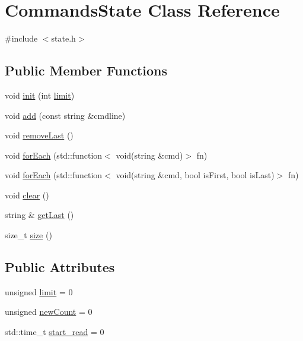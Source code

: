 \hypertarget{class_commands_state}{}\section{Commands\+State Class Reference}
\label{class_commands_state}


{\ttfamily \#include $<$state.\+h$>$}

\subsection*{Public Member Functions}
\begin{DoxyCompactItemize}
\item 
void \hyperlink{class_commands_state_a30081a551862ef539927f368fd729d1b}{init} (int \hyperlink{class_commands_state_ae3cbeca97ad210a6980d5c44cf6adee2}{limit})
\item 
void \hyperlink{class_commands_state_abd5de3a66178e6a7bead6ca7ff3bd1c3}{add} (const string \&cmdline)
\item 
void \hyperlink{class_commands_state_ae19501ca13fe9e1c5ebebe73eeaf8f72}{remove\+Last} ()
\item 
void \hyperlink{class_commands_state_a1cab17d80f32092592c5d863efe3a610}{for\+Each} (std\+::function$<$ void(string \&cmd)$>$ fn)
\item 
void \hyperlink{class_commands_state_a15f9a11035f9efddb3ea023a9fb63b61}{for\+Each} (std\+::function$<$ void(string \&cmd, bool is\+First, bool is\+Last)$>$ fn)
\item 
void \hyperlink{class_commands_state_a638034095963268ab56211c2933fddac}{clear} ()
\item 
string \& \hyperlink{class_commands_state_a55a67a2f27e9b500a993242b5e808d96}{get\+Last} ()
\item 
size\+\_\+t \hyperlink{class_commands_state_a74ea73a7753aee71cfdacb8ac0fc7ad7}{size} ()
\end{DoxyCompactItemize}
\subsection*{Public Attributes}
\begin{DoxyCompactItemize}
\item 
unsigned \hyperlink{class_commands_state_ae3cbeca97ad210a6980d5c44cf6adee2}{limit} = 0
\item 
unsigned \hyperlink{class_commands_state_a9d4a6edd6fc21c07150ec1bebf8516f4}{new\+Count} = 0
\item 
std\+::time\+\_\+t \hyperlink{class_commands_state_affdc3152f2776d90a04971104fea81af}{start\+\_\+read} = 0
\end{DoxyCompactItemize}


